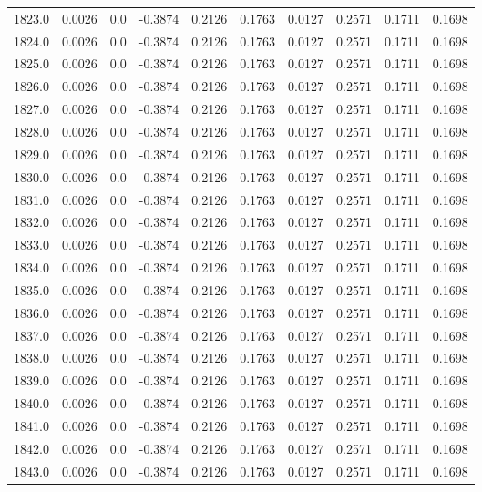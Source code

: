 \begin{longtable}{lrrrrrrrrr}
1823.0 & 0.0026 & 0.0 & -0.3874 & 0.2126 & 0.1763 & 0.0127 & 0.2571 & 0.1711 & 0.1698 \\
1824.0 & 0.0026 & 0.0 & -0.3874 & 0.2126 & 0.1763 & 0.0127 & 0.2571 & 0.1711 & 0.1698 \\
1825.0 & 0.0026 & 0.0 & -0.3874 & 0.2126 & 0.1763 & 0.0127 & 0.2571 & 0.1711 & 0.1698 \\
1826.0 & 0.0026 & 0.0 & -0.3874 & 0.2126 & 0.1763 & 0.0127 & 0.2571 & 0.1711 & 0.1698 \\
1827.0 & 0.0026 & 0.0 & -0.3874 & 0.2126 & 0.1763 & 0.0127 & 0.2571 & 0.1711 & 0.1698 \\
1828.0 & 0.0026 & 0.0 & -0.3874 & 0.2126 & 0.1763 & 0.0127 & 0.2571 & 0.1711 & 0.1698 \\
1829.0 & 0.0026 & 0.0 & -0.3874 & 0.2126 & 0.1763 & 0.0127 & 0.2571 & 0.1711 & 0.1698 \\
1830.0 & 0.0026 & 0.0 & -0.3874 & 0.2126 & 0.1763 & 0.0127 & 0.2571 & 0.1711 & 0.1698 \\
1831.0 & 0.0026 & 0.0 & -0.3874 & 0.2126 & 0.1763 & 0.0127 & 0.2571 & 0.1711 & 0.1698 \\
1832.0 & 0.0026 & 0.0 & -0.3874 & 0.2126 & 0.1763 & 0.0127 & 0.2571 & 0.1711 & 0.1698 \\
1833.0 & 0.0026 & 0.0 & -0.3874 & 0.2126 & 0.1763 & 0.0127 & 0.2571 & 0.1711 & 0.1698 \\
1834.0 & 0.0026 & 0.0 & -0.3874 & 0.2126 & 0.1763 & 0.0127 & 0.2571 & 0.1711 & 0.1698 \\
1835.0 & 0.0026 & 0.0 & -0.3874 & 0.2126 & 0.1763 & 0.0127 & 0.2571 & 0.1711 & 0.1698 \\
1836.0 & 0.0026 & 0.0 & -0.3874 & 0.2126 & 0.1763 & 0.0127 & 0.2571 & 0.1711 & 0.1698 \\
1837.0 & 0.0026 & 0.0 & -0.3874 & 0.2126 & 0.1763 & 0.0127 & 0.2571 & 0.1711 & 0.1698 \\
1838.0 & 0.0026 & 0.0 & -0.3874 & 0.2126 & 0.1763 & 0.0127 & 0.2571 & 0.1711 & 0.1698 \\
1839.0 & 0.0026 & 0.0 & -0.3874 & 0.2126 & 0.1763 & 0.0127 & 0.2571 & 0.1711 & 0.1698 \\
1840.0 & 0.0026 & 0.0 & -0.3874 & 0.2126 & 0.1763 & 0.0127 & 0.2571 & 0.1711 & 0.1698 \\
1841.0 & 0.0026 & 0.0 & -0.3874 & 0.2126 & 0.1763 & 0.0127 & 0.2571 & 0.1711 & 0.1698 \\
1842.0 & 0.0026 & 0.0 & -0.3874 & 0.2126 & 0.1763 & 0.0127 & 0.2571 & 0.1711 & 0.1698 \\
1843.0 & 0.0026 & 0.0 & -0.3874 & 0.2126 & 0.1763 & 0.0127 & 0.2571 & 0.1711 & 0.1698 \\

\end{longtable}
